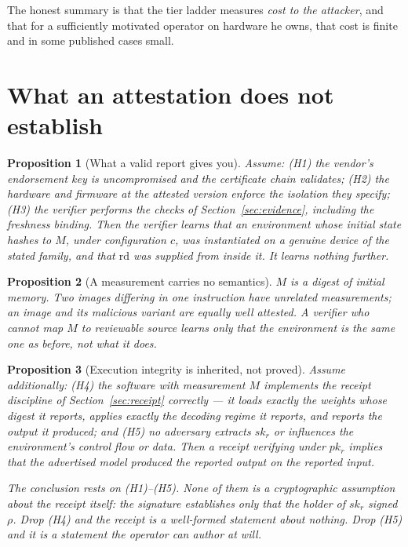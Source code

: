 \documentclass[11pt]{article}
\newtheorem{proposition}{Proposition}
\begin{document}
The honest summary is that the tier ladder measures \emph{cost to the attacker}, and that for a
sufficiently motivated operator on hardware he owns, that cost is finite and in some published cases
small.

\section{What an attestation does not establish}
\label{sec:notproved}

\begin{proposition}[What a valid report gives you]
\label{prop:report}
Assume: \textup{(H1)} the vendor's endorsement key is uncompromised and the certificate chain
validates; \textup{(H2)} the hardware and firmware at the attested version enforce the isolation
they specify; \textup{(H3)} the verifier performs the checks of Section~\ref{sec:evidence},
including the freshness binding. Then the verifier learns that an environment whose initial state
hashes to $M$, under configuration $c$, was instantiated on a genuine device of the stated family,
and that $\mathrm{rd}$ was supplied from inside it. It learns nothing further.
\end{proposition}

\begin{proposition}[A measurement carries no semantics]
\label{prop:semantics}
$M$ is a digest of initial memory. Two images differing in one instruction have unrelated
measurements; an image and its malicious variant are equally well attested. A verifier who cannot map
$M$ to reviewable source learns only that the environment is the same one as before, not what it
does.
\end{proposition}

\begin{proposition}[Execution integrity is inherited, not proved]
\label{prop:inherit}
Assume additionally: \textup{(H4)} the software with measurement $M$ implements the receipt
discipline of Section~\ref{sec:receipt} correctly --- it loads exactly the weights whose digest it
reports, applies exactly the decoding regime it reports, and reports the output it produced; and
\textup{(H5)} no adversary extracts $sk_r$ or influences the environment's control flow or data.
Then a receipt verifying under $pk_r$ implies that the advertised model produced the reported output
on the reported input.

The conclusion rests on \textup{(H1)--(H5)}. None of them is a cryptographic assumption about the
receipt itself: the signature establishes only that the holder of $sk_r$ signed $\rho$. Drop
\textup{(H4)} and the receipt is a well-formed statement about nothing. Drop \textup{(H5)} and it is
a statement the operator can author at will.
\end{proposition}
\end{document}
